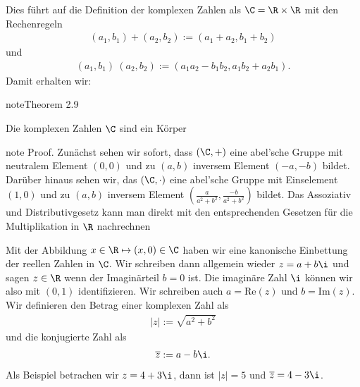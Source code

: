 \documentclass[letterpaper,10pt,english]{jupyterBook}
\begin{document}
Dies führt auf die Definition der komplexen Zahlen als \(\C = \R \times \R\) mit den Rechenregeln
\begin{equation*}
\begin{split} (a_1,b_1) +(a_2,b_2) := (a_1+a_2,b_1+b_2)\end{split}
\end{equation*}
und
\begin{equation*}
\begin{split} (a_1,b_1) ~(a_2,b_2) := (a_1 a_2 - b_1 b_2,a_1 b_2   + a_2 b_1).\end{split}
\end{equation*}
Damit erhalten wir:
\label{grundlagen/zahlensysteme:theorem-29}
\begin{sphinxadmonition}{note}{Theorem 2.9}



Die komplexen Zahlen \(\C\) sind ein Körper
\end{sphinxadmonition}

\begin{sphinxadmonition}{note}
Proof.  Zunächst sehen wir sofort, dass \((\C,+)\) eine abel’sche Gruppe mit neutralem Element \((0,0)\) und zu \((a,b)\) inversem Element \((-a,-b)\) bildet. Darüber hinaus sehen wir, das \((\C,\cdot)\) eine abel’sche Gruppe mit Einselement \((1,0)\) und zu \((a,b)\) inversem Element \((\frac{a}{a^2+b^2},  \frac{-b}{a^2+b^2}) \) bildet. Das Assoziativ\sphinxhyphen{} und Distributivgesetz kann man direkt mit den entsprechenden Gesetzen für die Multiplikation in \(\R\) nachrechnen
\end{sphinxadmonition}

Mit der Abbildung \(x \in \R \mapsto (x,0) \in \C\) haben wir eine kanonische Einbettung der reellen Zahlen in \(\C\). Wir schreiben dann allgemein wieder \(z=a+b\i\) und sagen \(z \in\R\) wenn der Imaginärteil \(b=0\) ist.  Die imaginäre Zahl \(\i\) können wir also mit \((0,1)\) identifizieren.  Wir schreiben auch \(a=\)Re\((z)\) und \(b=\)Im\((z)\). Wir definieren den Betrag einer komplexen Zahl als
\begin{equation*}
\begin{split} |z| := \sqrt{a^2+b^2}\end{split}
\end{equation*}
und die konjugierte Zahl als
\begin{equation*}
\begin{split} \overline{z} := a - b \i.\end{split}
\end{equation*}
Als Beispiel betrachen wir \(z= 4+3\i\), dann ist \(|z|=5\) und \(\overline{z}=4-3\i\).
\end{document}
